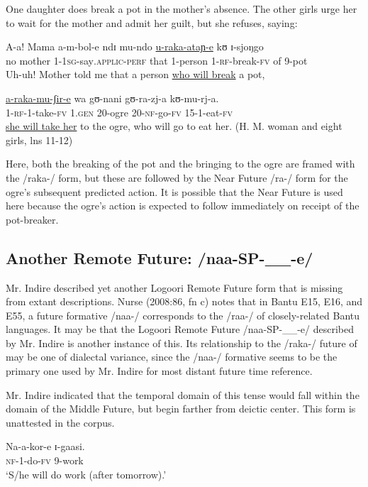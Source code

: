 \documentclass[output=paper]{langsci/langscibook}
\begin{document}
One daughter does break a pot in the mother’s absence. The other girls urge her to wait for the mother and admit her guilt, but she refuses, saying:

\ea\label{ex:sarvasy:15}
\gll A-a!  Mama    a-m-bol-e      ndɪ   mu-ndo   \underline{u-raka-ataɲ-e}   kʊ   ɪ{}-sjoŋgo  \\
no  mother  1-1\textsc{sg}{}-say\textsc{.applic-perf}  that  1-person  1\textsc{{}-rf}{}-break-\textsc{fv}  of  9-pot\\
\glt Uh-uh! Mother told me that a person \underline{who will break} a pot,

\gll \underline{a-raka-mu-ʃir-e}   wa   gʊ-nani  gʊ-ra-zj-a  kʊ-mu-rj-a.\\
1\textsc{{}-rf-}1-take-\textsc{fv}    1.\textsc{gen}  20-ogre  20-\textsc{nf}{}-go-\textsc{fv}  15-1-eat-\textsc{fv} \\
\glt \underline{she will take her} to the ogre, who will go to eat her. (H. M. woman and eight girls, lns 11-12)
\z

Here, both the breaking of the pot and the bringing to the ogre are framed with the /raka-/ form, but these are followed by the Near Future /ra-/ form for the ogre’s subsequent predicted action. It is possible that the Near Future is used here because the ogre’s action is expected to follow immediately on receipt of the pot-breaker.

\subsection{Another Remote Future: /naa-SP-\_\_-e/}\label{sec:sarvasy:6.2}

Mr. Indire described yet another Logoori Remote Future form that is missing from extant descriptions. Nurse (2008:86, fn c) notes that in Bantu E15, E16, and E55, a future formative /naa-/ corresponds to the /raa-/ of closely-related Bantu languages. It may be that the Logoori Remote Future /naa-SP-\_\_-e/ described by Mr. Indire is another instance of this. Its relationship to the /raka-/ future of  may be one of dialectal variance, since the /naa-/ formative seems to be the primary one used by Mr. Indire for most distant future time reference.

Mr. Indire indicated that the temporal domain of this tense would fall within the domain of the Middle Future, but begin farther from deictic center. This form is unattested in the corpus.

\ea\label{ex:sarvasy:16}
\gll Na-a-kor-e  ɪ{}-gaasi. \\
\textsc{nf}{}-1-do-\textsc{fv}  9-work \\
\glt ‘S/he will do work (after tomorrow).’
\z 
\end{document}
